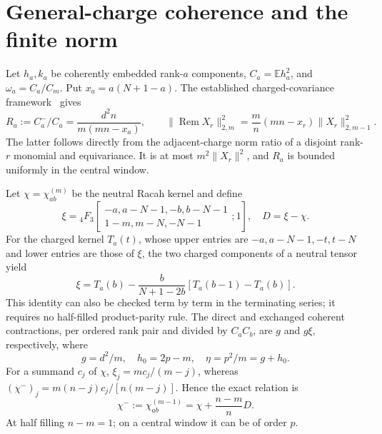 \documentclass[11pt,a4paper]{article}
\newcommand{\EE}{\mathbb E}
\newcommand{\Rem}{\operatorname{Rem}}
\begin{document}
\newpage
\section{General-charge coherence and the finite norm}
Let $h_a,k_a$ be coherently embedded rank-$a$ components,
$C_a=\EE h_a^2$, and $\omega_a=C_a/C_m$. Put $x_a=a(N+1-a)$.
The established charged-covariance framework~\cite{KV,local} gives
\begin{equation}
 R_a:=C_a^-/C_a=\frac{d^2n}{m(mn-x_a)},\qquad
 \|\Rem X_r\|_{2,m}^2=\frac m n(mn-x_r)\|X_r\|_{2,m-1}^2.
 \label{transfer}
\end{equation}
The latter follows directly from the adjacent-charge norm ratio
of a disjoint rank-$r$ monomial and equivariance. It is at most
$m^2\|X_r\|^2$, and $R_a$ is bounded uniformly in the central window.

Let $\chi=\chi^{(m)}_{ab}$ be the neutral Racah kernel and define
\begin{equation}
 \xi={}_4F_3\!\left[\begin{matrix}-a,a-N-1,-b,b-N-1\\
                      1-m,m-N,-N-1\end{matrix};1\right],\quad D=\xi-\chi.
\end{equation}
For the charged kernel $T_a(t)$, whose upper entries are
$-a,a-N-1,-t,t-N$ and lower entries are those of $\xi$, the
two charged components of a neutral tensor yield
\begin{equation}
 \xi=T_a(b)-\frac{b}{N+1-2b}[T_a(b-1)-T_a(b)].\label{xi}
\end{equation}
This identity can also be checked term by term in the terminating
series; it requires no half-filled product-parity rule. The direct
and exchanged coherent contractions, per ordered rank pair and
divided by $C_aC_b$, are $g$ and $g\xi$, respectively, where
\begin{equation}
 g=d^2/m,\quad h_0=2p-m,\quad \eta=p^2/m=g+h_0.
\end{equation}
For a summand $c_j$ of $\chi$, $\xi_j=mc_j/(m-j)$, whereas
$(\chi^-)_j=m(n-j)c_j/[n(m-j)]$. Hence the exact relation is
\begin{equation}
 \boxed{\quad\chi^-:=\chi^{(m-1)}_{ab}
   =\chi+\frac{n-m}{n}D.\quad}\label{contiguous}
\end{equation}
At half filling $n-m=1$; on a central window it can be of order $p$.
\end{document}
